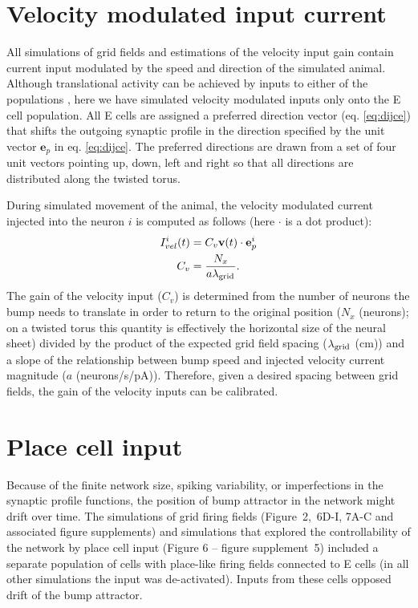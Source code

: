 \documentclass[a4paper,12pt]{article}
\newcommand{\ssc}[3]{\ensuremath{#1_{\text{#2}_{\text{#3}}}}}
\newcommand{\lamgrid}{\ssc{\lambda}{\scriptsize{grid}}{}}
\begin{document}


\section{Velocity modulated input current } \label{sec:Ivel}

All simulations of grid fields and estimations of the velocity input gain
contain current input modulated by the speed and direction of the simulated
animal. Although translational activity can be achieved by inputs to either of
the populations \citep{Pastoll:2013ff}, here we have simulated velocity
modulated inputs only onto the E cell population. All E cells are assigned a
preferred direction vector (eq. \ref{eq:dijce}) that shifts the outgoing
synaptic profile in the direction specified by the unit vector $\mathbf{e}_p$
in eq. \eqref{eq:dijce}. The preferred directions are drawn from a set of four
unit vectors pointing up, down, left and right so that all directions are
distributed along the twisted torus.

During simulated movement of the animal, the velocity modulated current
injected into the neuron $i$ is computed as follows (here $\cdot$ is a dot
product):
\begin{eqnarray}
    I_{vel}^i(t) &= C_v \mathbf{v}(t) \cdot \mathbf{e}_p^i \notag \\
    C_v          &= \frac{N_x}{a\lamgrid}.
\end{eqnarray}
The gain of the velocity input ($C_v$) is determined from the number of neurons
the bump needs to translate in order to return to the original position
($N_x$ (neurons); on a twisted torus this quantity is effectively the horizontal size of
the neural sheet) divided by the product of the expected grid field spacing
($\lamgrid$ (cm)) and a slope of the relationship between bump speed and injected
velocity current magnitude ($a$ (neurons/s/pA)). Therefore, given a desired
spacing between grid fields, the gain of the velocity inputs can be calibrated.


\section{Place cell input} \label{sec:place_cells}

Because of the finite network size, spiking variability, or imperfections in
the synaptic profile functions, the position of bump attractor in the network
might drift over time. The simulations of grid firing fields (Figure~2,~6D-I,
7A-C and associated figure supplements) and simulations that explored the
controllability of the network by place cell input (Figure 6 -- figure
supplement~5) included a separate population of cells
with place-like firing fields connected to E cells (in all other simulations
the input was de-activated). Inputs from these cells opposed drift of the bump
attractor.
\end{document}
